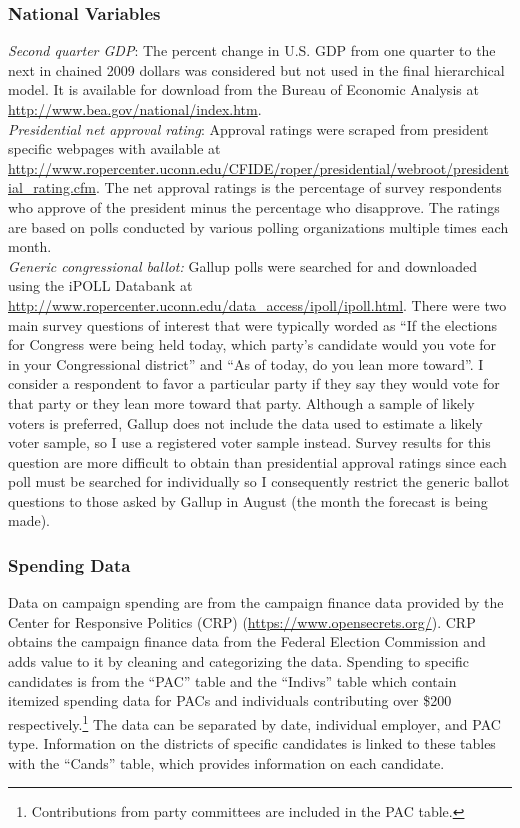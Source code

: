 \documentclass[12pt,final,fleqn]{article}
\theoremstyle{plain}
\begin{document}
\subsubsection{National Variables}
\emph{Second quarter GDP}: The percent change in U.S. GDP from one quarter to the next in chained 2009 dollars was considered but not used in the final hierarchical model. It is available for download from the Bureau of Economic Analysis at \url{http://www.bea.gov/national/index.htm}. \\
\emph{Presidential net approval rating}: Approval ratings were scraped from president specific webpages with available at \url{http://www.ropercenter.uconn.edu/CFIDE/roper/presidential/webroot/presidential_rating.cfm}. The net approval ratings is the percentage of survey respondents who approve of the president minus the percentage who disapprove. The ratings are based on polls conducted by various polling organizations multiple times each month. \\
\emph{Generic congressional ballot:} Gallup polls were searched for and downloaded using the iPOLL Databank at \url{http://www.ropercenter.uconn.edu/data_access/ipoll/ipoll.html}. There were two main survey questions of interest that were typically worded as ``If the elections for Congress were being held today, which party's candidate would you vote for in your 
Congressional district'' and ``As of today, do you lean more toward''. I consider a respondent to favor a particular party if they say they would vote for that party or they lean more toward that party. Although a sample of likely voters is preferred, Gallup does not include the data used to estimate a likely voter sample, so I use a registered voter sample instead. Survey results for this question are more difficult to obtain than presidential approval ratings since each poll must be searched for individually so I consequently restrict the generic ballot questions to those asked by Gallup in August (the month the forecast is being made).

\subsubsection{Spending Data}
Data on campaign spending are from the campaign finance data provided by the Center for Responsive Politics (CRP) (\url{https://www.opensecrets.org/}). CRP obtains the campaign finance data from the Federal Election Commission and adds value to it by cleaning and categorizing the data. Spending to specific candidates is from the ``PAC'' table and the ``Indivs'' table which contain itemized spending data for PACs and individuals contributing over \$200 respectively.\footnote{Contributions from party committees are included in the PAC table.} The data can be separated by date, individual employer, and PAC type. Information on the districts of specific candidates is linked to these tables with the ``Cands'' table, which provides information on each candidate. 
\end{document}
